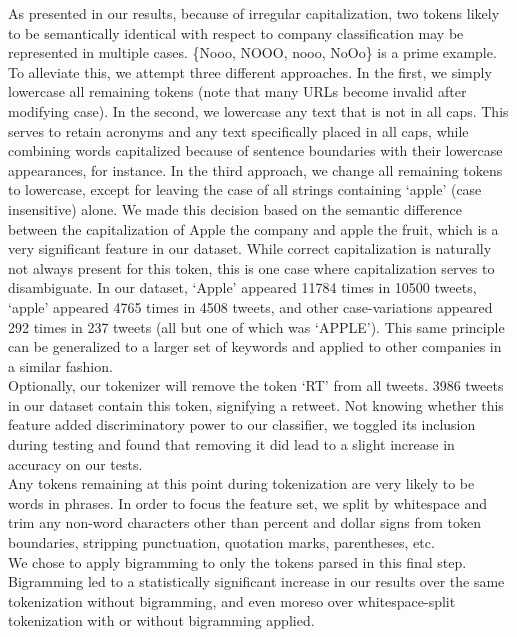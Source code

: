 \documentclass[letterpaper]{article}
\begin{document}
As presented in our results, because of irregular capitalization, two tokens likely to be semantically identical with respect to company classification may be represented in multiple cases. \{Nooo, NOOO, nooo, NoOo\} is a prime example. To alleviate this, we attempt three different approaches. In the first, we simply lowercase all remaining tokens (note that many URLs become invalid after modifying case). In the second, we lowercase any text that is not in all caps. This serves to retain acronyms and any text specifically placed in all caps, while combining words capitalized because of sentence boundaries with their lowercase appearances, for instance. In the third approach, we change all remaining tokens to lowercase, except for leaving the case of all strings containing `apple' (case insensitive) alone. We made this decision based on the semantic difference between the capitalization of Apple the company and apple the fruit, which is a very significant feature in our dataset. While correct capitalization is naturally not always present for this token, this is one case where capitalization serves to disambiguate. In our dataset, `Apple' appeared 11784 times in 10500 tweets, `apple' appeared 4765 times in 4508 tweets, and other case-variations appeared 292 times in 237 tweets (all but one of which was `APPLE'). This same principle can be generalized to a larger set of keywords and applied to other companies in a similar fashion. \\

Optionally, our tokenizer will remove the token `RT' from all tweets. 3986 tweets in our dataset contain this token, signifying a retweet. Not knowing whether this feature added discriminatory power to our classifier, we toggled its inclusion during testing and found that removing it did lead to a slight increase in accuracy on our tests.\\

Any tokens remaining at this point during tokenization are very likely to be words in phrases. In order to focus the feature set, we split by whitespace and trim any non-word characters other than percent and dollar signs from token boundaries, stripping punctuation, quotation marks, parentheses, etc. \\

We chose to apply bigramming to only the tokens parsed in this final step. Bigramming led to a statistically significant increase in our results over the same tokenization without bigramming, and even moreso over whitespace-split tokenization with or without bigramming applied.\\
\end{document}
